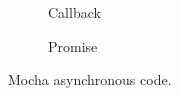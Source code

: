 
\begin{figure}[H]
	\newcommand{\basicstyle}{\scriptsize}
	\centering
	\begin{subfigure}[b]{0.45\textwidth}
        
        \caption{Callback}
        \label{fig:mocha_callback}
    \end{subfigure}
    \begin{subfigure}[b]{0.5\textwidth}
		
        \caption{Promise}
        \label{fig:mocha_promise}
    \end{subfigure}
	\caption[Mocha asynchronous code]{Mocha asynchronous code.}
	\label{fig:mocha_asynchronous_code}
\end{figure}
